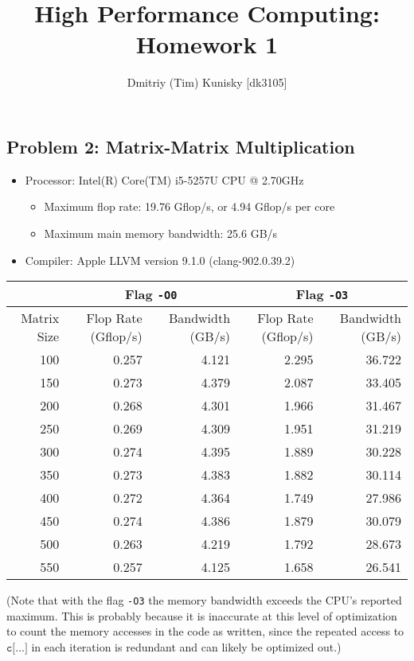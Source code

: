 \documentclass[11pt]{article}
\title{High Performance Computing: Homework 1}
\author{Dmitriy (Tim) Kunisky [dk3105]}
\date{}
\theoremstyle{plain} %
\begin{document}
\maketitle

\subsection*{Problem 2: Matrix-Matrix Multiplication}

\begin{itemize}
\item Processor: Intel(R) Core(TM) i5-5257U CPU @ 2.70GHz
    \begin{itemize}
    \item Maximum flop rate: 19.76 Gflop/s, or 4.94 Gflop/s per core
    \item Maximum main memory bandwidth: 25.6 GB/s
    \end{itemize}
\item Compiler: Apple LLVM version 9.1.0 (clang-902.0.39.2)
\end{itemize}

\begin{center}
\small
\begin{tabular}{r|rr|rr}
  & \multicolumn{2}{c|}{Flag \texttt{-O0}} & \multicolumn{2}{c}{Flag \texttt{-O3}} \\
  \hline
  Matrix Size & Flop Rate (Gflop/s) & Bandwidth (GB/s) & Flop Rate (Gflop/s) & Bandwidth (GB/s) \\
  \hline
  100 & 0.257 & 4.121 & 2.295 & 36.722 \\
  150 & 0.273 & 4.379 & 2.087 & 33.405 \\
  200 & 0.268 & 4.301 & 1.966 & 31.467 \\
  250 & 0.269 & 4.309 & 1.951 & 31.219 \\
  300 & 0.274 & 4.395 & 1.889 & 30.228 \\
  350 & 0.273 & 4.383 & 1.882 & 30.114 \\
  400 & 0.272 & 4.364 & 1.749 & 27.986\\
  450 & 0.274 & 4.386 & 1.879 & 30.079 \\
  500 & 0.263 & 4.219 & 1.792 & 28.673 \\
  550 & 0.257 & 4.125 & 1.658 & 26.541 \\
  \hline
\end{tabular}
\end{center}

\noindent
(Note that with the flag \texttt{-O3} the memory bandwidth exceeds the CPU's reported maximum. This is probably because it is inaccurate at this level of optimization to count the memory accesses in the code as written, since the repeated access to $\texttt{c[...]}$ in each iteration is redundant and can likely be optimized out.)
\end{document}
